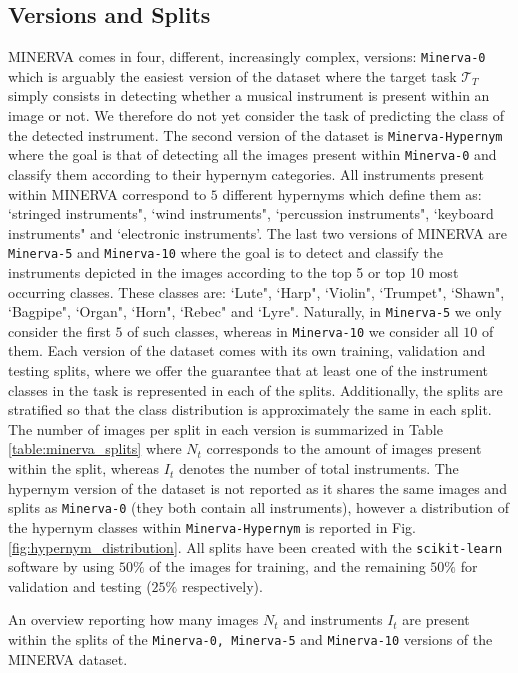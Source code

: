 \subsection{Versions and Splits}

MINERVA comes in four, different, increasingly complex, versions: \texttt{Minerva-0} which is arguably the easiest version of the dataset where the target task $\mathcal{T}_T$ simply consists in detecting whether a musical instrument is present within an image or not. We therefore do not yet consider the task of predicting the class of the detected instrument. The second version of the dataset is \texttt{Minerva-Hypernym} where the goal is that of detecting all the images present within \texttt{Minerva-0} and classify them according to their hypernym categories. All instruments present within MINERVA correspond to $5$ different hypernyms which define them as: `stringed instruments", `wind instruments", `percussion instruments", `keyboard instruments" and `electronic instruments'. The last two versions of MINERVA are \texttt{Minerva-5} and \texttt{Minerva-10} where the goal is to detect and classify the instruments depicted in the images according to the top 5 or top 10 most occurring classes. These classes are: `Lute", `Harp", `Violin", `Trumpet", `Shawn", `Bagpipe", `Organ", `Horn", `Rebec" and `Lyre". Naturally, in \texttt{Minerva-5} we only consider the first $5$ of such classes, whereas in \texttt{Minerva-10} we consider all $10$ of them. Each version of the dataset comes with its own training, validation and testing splits, where we offer the guarantee that at least one of the instrument classes in the task is represented in each of the splits. Additionally, the splits are stratified so that the class distribution is approximately the same in each split. The number of images per split in each version is summarized in Table \ref{table:minerva_splits} where $N_t$ corresponds to the amount of images present within the split, whereas $I_t$ denotes the number of total instruments. The hypernym version of the dataset is not reported as it shares the same images and splits as \texttt{Minerva-0} (they both contain all instruments), however a distribution of the hypernym classes within \texttt{Minerva-Hypernym} is reported in Fig. \ref{fig:hypernym_distribution}. All splits have been created with the \texttt{scikit-learn} software \cite{pedregosa2011scikit} by using $50\%$ of the images for training, and the remaining $50\%$ for validation and testing ($25\%$ respectively). 

\begin{table}[ht!]
\caption{An overview reporting how many images $N_t$ and instruments $I_t$ are present within the splits of the \texttt{Minerva-0, Minerva-5} and \texttt{Minerva-10} versions of the MINERVA dataset.}
	
\label{table:minerva_splits}
\end{table}

